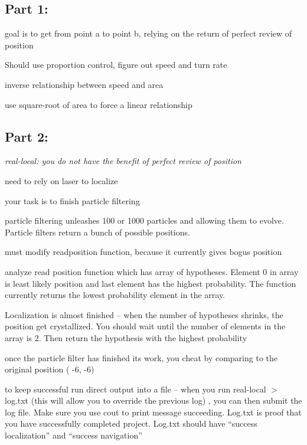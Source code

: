 \subsection*{Part 1\+:}


\begin{DoxyItemize}
\item goal is to get from point a to point b, relying on the return of perfect review of position
\item Should use proportion control, figure out speed and turn rate
\item inverse relationship between speed and area
\item use square-\/root of area to force a linear relationship
\end{DoxyItemize}

\subsection*{Part 2\+:}

{\itshape real-\/local\+: you do not have the benefit of perfect review of position}
\begin{DoxyItemize}
\item need to rely on laser to localize
\item your task is to finish particle filtering
\item particle filtering unleashes 100 or 1000 particles and allowing them to evolve. Particle filters return a bunch of possible positions.
\item must modify readposition function, because it currently gives bogus position
\item analyze read position function which has array of hypotheses. Element 0 in array is least likely position and last element has the highest probability. The function currently returns the lowest probability element in the array.
\item Localization is almost finished – when the number of hypotheses shrinks, the position get crystallized. You should wait until the number of elements in the array is 2. Then return the hypothesis with the highest probability
\item once the particle filter has finished its work, you cheat by comparing to the original position ( -\/6, -\/6)
\item to keep successful run direct output into a file – when you run real-\/local $>$ log.\+txt (this will allow you to override the previous log) , you can then submit the log file. Make sure you use cout to print message succeeding. Log.\+txt is proof that you have successfully completed project. Log.\+txt should have “success localization” and “success navigation” 
\end{DoxyItemize}